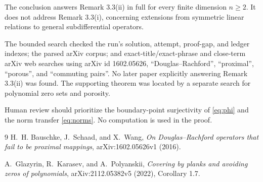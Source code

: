 \documentclass[11pt]{article}
\begin{document}
The conclusion answers Remark 3.3(ii) in full for every finite dimension
$n\ge2$.  It does not address Remark 3.3(i), concerning extensions from
symmetric linear relations to general subdifferential operators.

The bounded search checked the run's solution, attempt, proof-gap, and ledger
indexes; the parsed arXiv corpus; and exact-title/exact-phrase and close-term
arXiv web searches using arXiv id 1602.05626, ``Douglas--Rachford'',
``proximal'', ``porous'', and ``commuting pairs''.  No later paper explicitly
answering Remark 3.3(ii) was found.  The supporting theorem was located by a
separate search for polynomial zero sets and porosity.

Human review should prioritize the boundary-point surjectivity of
\eqref{eq:phi} and the norm transfer \eqref{eq:norms}.  No computation is used
in the proof.

\begin{thebibliography}{9}
H.~H. Bauschke, J.~Schaad, and X.~Wang,
\emph{On Douglas--Rachford operators that fail to be proximal mappings},
arXiv:1602.05626v1 (2016).

A.~Glazyrin, R.~Karasev, and A.~Polyanskii,
\emph{Covering by planks and avoiding zeros of polynomials},
arXiv:2112.05382v5 (2022), Corollary 1.7.
\end{thebibliography}
\end{document}
